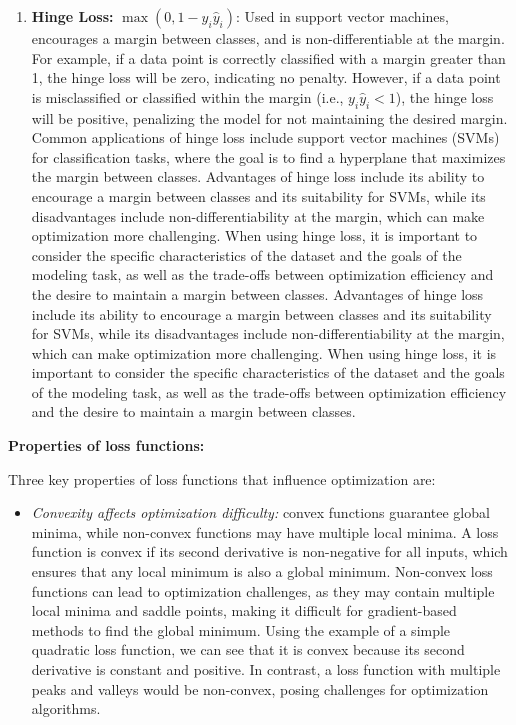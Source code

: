 \documentclass[
  letterpaper,
  DIV=11,
  numbers=noendperiod]{scrreprt}
\providecommand{\tightlist}{%
  \setlength{\itemsep}{0pt}\setlength{\parskip}{0pt}}
\begin{document}
\begin{enumerate}
  trade-offs between optimization efficiency and sensitivity to class
  imbalance.
\item
  \textbf{Hinge Loss:} \(\max(0, 1 - y_i \hat{y}_i)\): Used in support
  vector machines, encourages a margin between classes, and is
  non-differentiable at the margin. For example, if a data point is
  correctly classified with a margin greater than 1, the hinge loss will
  be zero, indicating no penalty. However, if a data point is
  misclassified or classified within the margin (i.e.,
  \(y_i \hat{y}_i < 1\)), the hinge loss will be positive, penalizing
  the model for not maintaining the desired margin. Common applications
  of hinge loss include support vector machines (SVMs) for
  classification tasks, where the goal is to find a hyperplane that
  maximizes the margin between classes. Advantages of hinge loss include
  its ability to encourage a margin between classes and its suitability
  for SVMs, while its disadvantages include non-differentiability at the
  margin, which can make optimization more challenging. When using hinge
  loss, it is important to consider the specific characteristics of the
  dataset and the goals of the modeling task, as well as the trade-offs
  between optimization efficiency and the desire to maintain a margin
  between classes. Advantages of hinge loss include its ability to
  encourage a margin between classes and its suitability for SVMs, while
  its disadvantages include non-differentiability at the margin, which
  can make optimization more challenging. When using hinge loss, it is
  important to consider the specific characteristics of the dataset and
  the goals of the modeling task, as well as the trade-offs between
  optimization efficiency and the desire to maintain a margin between
  classes.
\end{enumerate}

\textbf{Properties of loss functions:}

Three key properties of loss functions that influence optimization are:

\begin{itemize}
\tightlist
\item
  \emph{Convexity affects optimization difficulty:} convex functions
  guarantee global minima, while non-convex functions may have multiple
  local minima. A loss function is convex if its second derivative is
  non-negative for all inputs, which ensures that any local minimum is
  also a global minimum. Non-convex loss functions can lead to
  optimization challenges, as they may contain multiple local minima and
  saddle points, making it difficult for gradient-based methods to find
  the global minimum. Using the example of a simple quadratic loss
  function, we can see that it is convex because its second derivative
  is constant and positive. In contrast, a loss function with multiple
  peaks and valleys would be non-convex, posing challenges for
  optimization algorithms.
\end{itemize}
\end{document}

